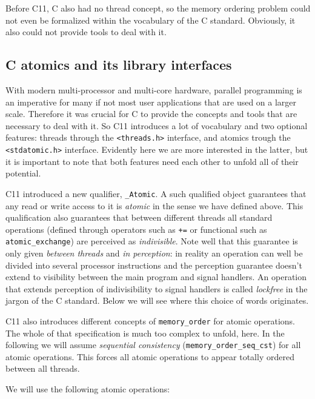 \documentclass{sig-alternate-05-2015}
\begin{document}
Before C11, C also had no thread concept, so the memory ordering
problem could not even be formalized within the vocabulary of the C
standard. Obviously, it also could not provide tools to deal with
it.

\subsection{C atomics and its library interfaces}
\label{sec-2-1}

With modern multi-processor and multi-core hardware, parallel
programming is an imperative for many if not most user applications
that are used on a larger scale. Therefore it was crucial for C to
provide the concepts and tools that are necessary to deal with
it. So C11 introduces a lot of vocabulary and two optional
features: threads through the \texttt{<threads.h>} interface, and atomics
trough the \texttt{<stdatomic.h>} interface. Evidently here we are more
interested in the latter, but it is important to note that both
features need each other to unfold all of their potential.

C11 introduced a new qualifier, \texttt{\_Atomic}. A such qualified object
guarantees that any read or write access to it is \emph{atomic} in the
sense we have defined above. This qualification also guarantees
that between different threads all standard operations (defined
through operators such as \texttt{+=} or functional such as
\texttt{atomic\_exchange}) are perceived as \emph{indivisible}. Note well that
this guarantee is only given \emph{between threads} and \emph{in perception}:
in reality an operation can well be divided into several processor
instructions and the perception guarantee doesn't extend to
visibility between the main program and signal handlers. An
operation that extends perception of indivisibility to signal
handlers is called \emph{lockfree} in the jargon of the C
standard. Below we will see where this choice of words originates.

C11 also introduces different concepts of \texttt{memory\_order} for atomic
operations. The whole of that specification is much too complex to
unfold, here. In the following we will assume \emph{sequential
consistency} (\texttt{memory\_order\_seq\_cst}) for all atomic
operations. This forces all atomic operations to appear totally
ordered between all threads.

We will use the following atomic operations:\vspace*{-3ex}
\end{document}
